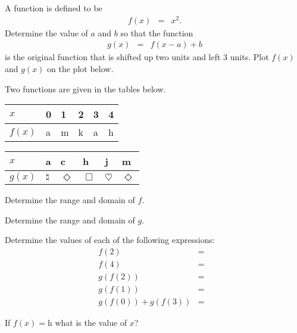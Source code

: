 \begin{problem}
\item A function is defined to be
  \begin{eqnarray*}
    f(x) & = & x^2.
  \end{eqnarray*}
  Determine the value of $a$ and $b$ so that the function
  \begin{eqnarray*}
    g(x) & = & f(x-a)+b
  \end{eqnarray*}
  is the original function that is shifted up two units and left 3
  units. Plot $f(x)$ and $g(x)$ on the plot below.

  \hspace*{-6em}
  \scalebox{0.95}{}

  \clearpage

\item Two functions are given in the tables below.

  \begin{tabular}[h]{l||l|l|l|l|l}
    $x$    & 0 & 1 & 2 & 3 & 4 \\ \hline
    $f(x)$ & a & m & k & a & h \\
  \end{tabular}

  \begin{tabular}[h]{l||l|l|l|l|l}
    $x$    & a & c & h & j & m \\ \hline
    $g(x)$ & $\natural$ & $\Diamond$ & $\Box$ & $\heartsuit$ & $\Diamond$ \\
  \end{tabular}

  \begin{subproblem}
  \item Determine the range and domain of $f$.
    \vspace{2em}
  \item Determine the range and domain of $g$.
    \vspace{2em}
  \item Determine the values of each of the following expressions:
    \begin{eqnarray*}
      f(2) & = & \\
      f(4) & = & \\
      g(f(2)) & = & \\
      g(f(1)) & = & \\
      g(f(0))+g(f(3)) & = &
    \end{eqnarray*}
  \item If $f(x)=$h what is the value of $x$?
  \end{subproblem}


\end{problem}
